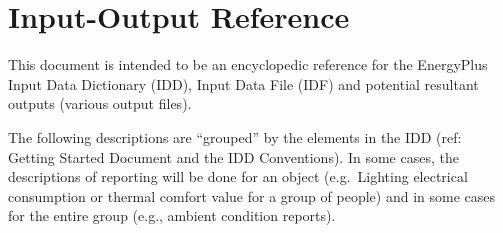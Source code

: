 \chapter{Input-Output Reference}\label{input-output-reference}

This document is intended to be an encyclopedic reference for the EnergyPlus Input Data Dictionary (IDD), Input Data File (IDF) and potential resultant outputs (various output files).

The following descriptions are ``grouped'' by the elements in the IDD (ref: Getting Started Document and the IDD Conventions). In some cases, the descriptions of reporting will be done for an object (e.g.~Lighting electrical consumption or thermal comfort value for a group of people) and in some cases for the entire group (e.g., ambient condition reports).







































